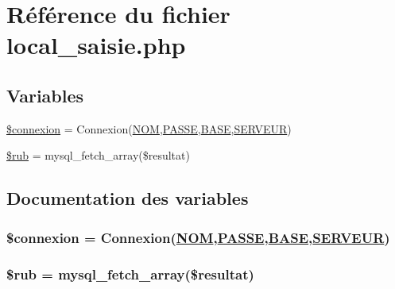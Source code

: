 \hypertarget{local__saisie_8php}{
\section{R\'{e}f\'{e}rence du fichier local\_\-saisie.php}
\label{local__saisie_8php}
}
\subsection*{Variables}
\begin{CompactItemize}
\item 
\hyperlink{local__saisie_8php_a0}{\$connexion} = Connexion(\hyperlink{pma__connect_8php_a0}{NOM},\hyperlink{pma__connect_8php_a1}{PASSE},\hyperlink{pma__connect_8php_a3}{BASE},\hyperlink{pma__connect_8php_a2}{SERVEUR})
\item 
\hyperlink{local__saisie_8php_a1}{\$rub} = mysql\_\-fetch\_\-array(\$resultat)
\end{CompactItemize}


\subsection{Documentation des variables}
\hypertarget{local__saisie_8php_a0}{
\subsubsection[\$connexion]{\setlength{\rightskip}{0pt plus 5cm}\$connexion = Connexion(\hyperlink{pma__connect_8php_a0}{NOM},\hyperlink{pma__connect_8php_a1}{PASSE},\hyperlink{pma__connect_8php_a3}{BASE},\hyperlink{pma__connect_8php_a2}{SERVEUR})}}
\label{local__saisie_8php_a0}


\hypertarget{local__saisie_8php_a1}{
\subsubsection[\$rub]{\setlength{\rightskip}{0pt plus 5cm}\$rub = mysql\_\-fetch\_\-array(\$resultat)}}
\label{local__saisie_8php_a1}


